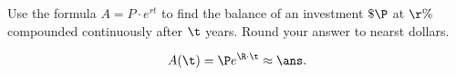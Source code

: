 





Use the formula $\displaystyle A=P\cdot e^{rt}$ to find the balance of an investment $\$\P$  at  $\r\%$ compounded continuously after $\t$ years. Round your answer to nearst dollars.

\begin{solution}
\[A(\t)=\P e^{\R \cdot \t}\approx \ans.\]
\end{solution}